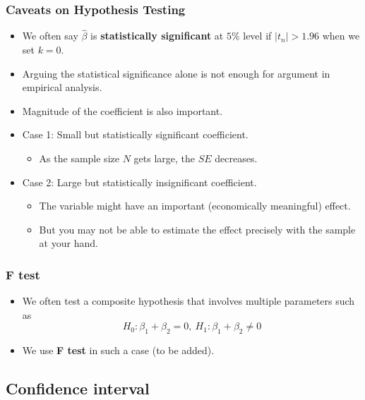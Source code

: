 \documentclass[]{book}
\providecommand{\tightlist}{%
  \setlength{\itemsep}{0pt}\setlength{\parskip}{0pt}}
\begin{document}
\subsubsection{Caveats on Hypothesis
Testing}\label{caveats-on-hypothesis-testing}

\begin{itemize}
\tightlist
\item
  We often say \(\hat{\beta}\) is \textbf{statistically significant} at
  \(5\%\) level if \(|t_{n}|>1.96\) when we set \(k=0\).
\item
  Arguing the statistical significance alone is not enough for argument
  in empirical analysis.
\item
  Magnitude of the coefficient is also important.
\item
  Case 1: Small but statistically significant coefficient.

  \begin{itemize}
  \tightlist
  \item
    As the sample size \(N\) gets large, the \(SE\) decreases.
  \end{itemize}
\item
  Case 2: Large but statistically insignificant coefficient.

  \begin{itemize}
  \tightlist
  \item
    The variable might have an important (economically meaningful)
    effect.
  \item
    But you may not be able to estimate the effect precisely with the
    sample at your hand.
  \end{itemize}
\end{itemize}

\subsubsection{F test}\label{f-test}

\begin{itemize}
\tightlist
\item
  We often test a composite hypothesis that involves multiple parameters
  such as \[
   H_{0}:\beta_{1} + \beta_2 = 0,\ H_{1}:\beta_{1} + \beta_2 \neq 0
  \]
\item
  We use \textbf{F test} in such a case (to be added).
\end{itemize}

\subsection{Confidence interval}\label{confidence-interval}
\end{document}
